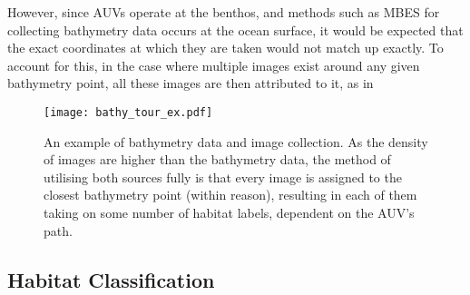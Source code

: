 However, since AUVs operate at the benthos, and methods such as MBES for collecting bathymetry data occurs at the ocean surface, it would be expected that the exact coordinates at which they are taken would not match up exactly. To account for this, in the case where multiple images exist around any given bathymetry point, all these images are then attributed to it, as in 

\begin{figure}
    \texttt{[image: bathy\_tour\_ex.pdf]}
    \caption{An example of bathymetry data and image collection. As the density of images are higher than the bathymetry data, the method of utilising both sources fully is that every image is assigned to the closest bathymetry point (within reason), resulting in each of them taking on some number of habitat labels, dependent on the AUV's path.}
    \label{fig:bathy_tour_ex}
\end{figure}

% 

\subsection{Habitat Classification}

